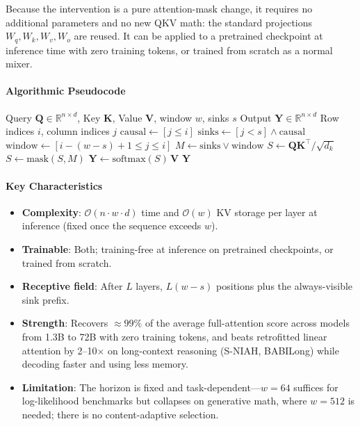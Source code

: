 Because the intervention is a pure attention-mask change, it requires no additional parameters and no new QKV math: the standard projections $W_q, W_k, W_v, W_o$ are reused. It can be applied to a pretrained checkpoint at inference time with zero training tokens, or trained from scratch as a normal mixer.

\paragraph{Algorithmic Pseudocode}

\begin{algorithm}[H]
\caption{SWA with Attention Sinks: Mask Construction and Attention}
\begin{algorithmic}[1]
\Require Query $\mathbf{Q} \in \mathbb{R}^{n \times d}$, Key $\mathbf{K}$, Value $\mathbf{V}$, window $w$, sinks $s$
\Ensure Output $\mathbf{Y} \in \mathbb{R}^{n \times d}$
\State Row indices $i$, column indices $j$
\State $\text{causal} \gets [j \leq i]$
\State $\text{sinks} \gets [j < s] \wedge \text{causal}$ 
\State $\text{window} \gets [i - (w-s) + 1 \leq j \leq i]$
\State $M \gets \text{sinks} \lor \text{window}$
\State $S \gets \mathbf{Q}\mathbf{K}^{\top} / \sqrt{d_k}$
\State $S \gets \text{mask}(S, M)$ 
\State $\mathbf{Y} \gets \text{softmax}(S)\, \mathbf{V}$
\Return $\mathbf{Y}$
\end{algorithmic}
\end{algorithm}

\paragraph{Key Characteristics}

\begin{itemize}[leftmargin=*]
    \item \textbf{Complexity}: $\mathcal{O}(n \cdot w \cdot d)$ time and $\mathcal{O}(w)$ KV storage per layer at inference (fixed once the sequence exceeds $w$).
    \item \textbf{Trainable}: Both; training-free at inference on pretrained checkpoints, or trained from scratch.
    \item \textbf{Receptive field}: After $L$ layers, $L(w-s)$ positions plus the always-visible sink prefix.
    \item \textbf{Strength}: Recovers $\approx 99\%$ of the average full-attention score across models from 1.3B to 72B with zero training tokens, and beats retrofitted linear attention by 2--10$\times$ on long-context reasoning (S-NIAH, BABILong) while decoding faster and using less memory.
    \item \textbf{Limitation}: The horizon is fixed and task-dependent---$w=64$ suffices for log-likelihood benchmarks but collapses on generative math, where $w=512$ is needed; there is no content-adaptive selection.
\end{itemize}

